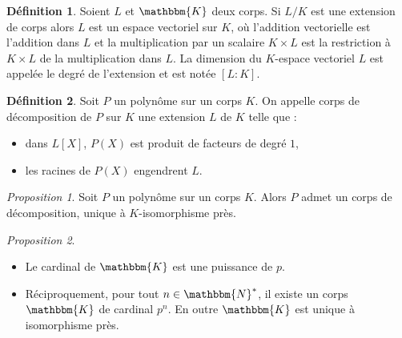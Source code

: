 \documentclass[12pt]{article}
\theoremstyle{remark}\newtheorem{note}{Note}
\theoremstyle{remark}\newtheorem{nota}{Notation}
\newcommand{\N}{\mathbbm{N}}
\newcommand{\K}{\mathbbm{K}}
\newtheorem{prop}{Proposition}
\theoremstyle{definition}
\newtheorem{definition}{Définition}
\begin{document}
\begin{definition}
Soient $L$ et $\K$ deux corps. Si $L/K$ est une extension de corps alors $L$ est un espace vectoriel sur $K$, où l'addition vectorielle est l'addition dans $L$ et la multiplication par un scalaire $K \times L$ est la restriction à $K \times L$ de la multiplication dans $L$. La dimension du $K$-espace vectoriel $L$ est appelée le degré de l'extension et est notée $[L:K]$.
\end{definition}
\vspace{12pt}
\begin{definition}
Soit $P$ un polynôme sur un corps $K$. On appelle corps de décomposition de $P$ sur $K$ une extension $L$ de $K$ telle que :
\begin{itemize}
\item dans $L[X]$, $P(X)$ est produit de facteurs de degré $1$,
\item les racines de $P(X)$ engendrent $L$.
\end{itemize}
\end{definition}
\vspace{12pt}
\begin{prop}
Soit $P$ un polynôme sur un corps $K$. Alors $P$ admet un corps de décomposition, unique à $K$-isomorphisme près.
\end{prop}
\vspace{30pt}
\begin{prop}\hspace{12pt}
\begin{itemize}
\item Le cardinal de $\K$ est une puissance de $p$.
\item Réciproquement, pour tout $n \in \N^{*}$, il existe un corps $\K$ de cardinal $p^n$. En outre $\K$ est unique à isomorphisme près.
\end{itemize}
\end{prop}
\end{document}
